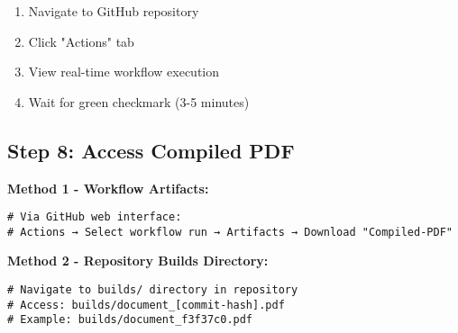 \begin{enumerate}
    \item Navigate to GitHub repository
    \item Click "Actions" tab
    \item View real-time workflow execution
    \item Wait for green checkmark (3-5 minutes)
\end{enumerate}

\subsection{Step 8: Access Compiled PDF}

\textbf{Method 1 - Workflow Artifacts:}
\begin{verbatim}
# Via GitHub web interface:
# Actions → Select workflow run → Artifacts → Download "Compiled-PDF"
\end{verbatim}

\textbf{Method 2 - Repository Builds Directory:}
\begin{verbatim}
# Navigate to builds/ directory in repository
# Access: builds/document_[commit-hash].pdf
# Example: builds/document_f3f37c0.pdf
\end{verbatim}
